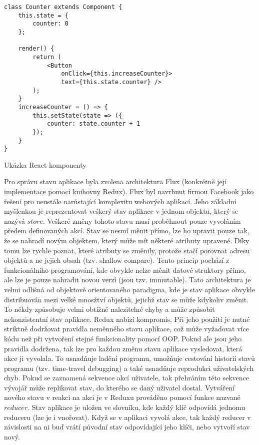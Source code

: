 \begin{listing}
\begin{verbatim}
class Counter extends Component {
    this.state = {
        counter: 0
    };

    render() {
        return (
            <Button
                onClick={this.increaseCounter}>
                text={this.state.counter} />
        );
    }
    increaseCounter = () => {
        this.setState(state => ({
            counter: state.counter + 1
        });
    }
}
\end{verbatim}
\caption{Ukázka React komponenty}
\label{code:reactcomponent}
\end{listing}

Pro správu stavu aplikace byla zvolena architektura Flux (konkrétně její implementace pomocí knihovny Redux). Flux byl navrhnut firmou Facebook jako řešení pro neustále narůstající komplexitu webových aplikací. Jeho základní myšlenkou je reprezentovat veškerý stav aplikace v jednom objektu, který se nazývá $store$. Veškeré změny tohoto stavu musí proběhnout pouze vyvoláním předem definovaných akcí. Stav se nesmí měnit přímo, lze ho upravit pouze tak, že se nahradí novým objektem, který může mít některé atributy upravené. Díky tomu lze rychle poznat, které atributy se změnily, protože stačí porovnat adresu objektů a ne jejich obsah (tzv. shallow compare). Tento princip pochází z funkcionálního programování, kde obvykle nelze měnit datové struktory přímo, ale lze je pouze nahradit novou verzí (jsou tzv. immutable). Tato architektura je velmi odlišná od objektově orientovaného paradigma, kde je stav aplikace obvykle distribuován mezi velké mnosžtví objektů, jejichž stav se může kdykoliv změnit. To někdy způsobuje velmi obtížně nalezitelné chyby a může způsobit nekonzistentní stav aplikace. Redux nabízí kompromis. Při jeho použití je nutné striktně dodržovat pravidla neměnného stavu aplikace, což může vyžadovat více kódu než při vytvoření stejné funkcionality pomocí OOP. Pokud ale jsou jeho pravidla dodržena, tak lze pro každou změnu stavu aplikace vysledovat, která akce ji vyvolala. To usnadňuje ladění programu, umožňuje cestování historií stavů programu (tzv. time-travel debugging) a také usnadňuje reprodukci uživatelských chyb. Pokud se zaznamená sekvence akcí uživatele, tak přehráním této sekvence vývojář může replikovat stav, do kterého se daný uživatel dostal. 
Vytváření nového stavu v reakci na akci je v Reduxu prováděno pomocí funkce nazvané $reducer$. Stav aplikace je uložen ve slovníku, kde každý klíč odpovídá jednomu reduceru (lze je i vnořovat). Když se v aplikaci vyvolá akce, tak každý reducer v závislosti na ni buď vrátí původní stav odpovídající jeho klíči, nebo vytvoří stav nový.
